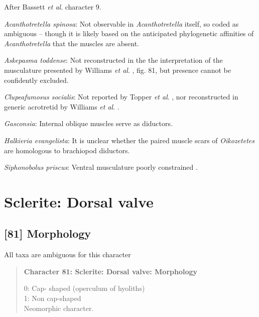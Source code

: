 \documentclass[openany]{book}
\theoremstyle{definition}
\theoremstyle{definition}
\theoremstyle{definition}
\theoremstyle{remark}
\begin{document}
After Bassett \emph{et al}.
\citeyearpar{Bassett2001Functionalmorphology} character 9.

\hypertarget{Acanthotretella_spinosa-coding-80}{}
\emph{Acanthotretella spinosa}: Not observable in \emph{Acanthotretella}
itself, so coded as ambiguous -- though it is likely based on the
anticipated phylogenetic affinities of \emph{Acanthotretella} that the
muscles are absent.

\hypertarget{Askepasma_toddense-coding-80}{}
\emph{Askepasma toddense}: Not reconstructed in the the interpretation
of the musculature presented by Williams \emph{et al}.
\citeyearpar{Williams2000LinguliformeaCraniiformea}, fig. 81, but
presence cannot be confidently excluded.

\hypertarget{Clupeafumosus_socialis-coding-80}{}
\emph{Clupeafumosus socialis}: Not reported by Topper \emph{et al}.
\citeyearpar{Topper2013Reappraisalof}, nor reconstructed in generic
acrotretid by Williams \emph{et al}.
\citeyearpar{Williams2000LinguliformeaCraniiformea}.

\hypertarget{Gasconsia-coding-80}{}
\emph{Gasconsia}: Internal oblique muscles serve as diductors.

\hypertarget{Halkieria_evangelista-coding-80}{}
\emph{Halkieria evangelista}: It is unclear whether the paired muscle
scars of \emph{Oikozetetes} are homologous to brachiopod diductors.

\hypertarget{Siphonobolus_priscus-coding-80}{}
\emph{Siphonobolus priscus}: Ventral musculature poorly constrained
\citep{Williams2000LinguliformeaCraniiformea, Popov2009Earlyontogeny}.

\section{Sclerite: Dorsal valve}\label{sclerite-dorsal-valve}

\subsection*{{[}81{]} Morphology}\label{morphology-2}

All taxa are ambiguous for this character

\begin{quote}
\textbf{Character 81: Sclerite: Dorsal valve: Morphology}

0: Cap- shaped (operculum of hyoliths)\\
1: Non cap-shaped\\
Neomorphic character.
\end{quote}
\end{document}
